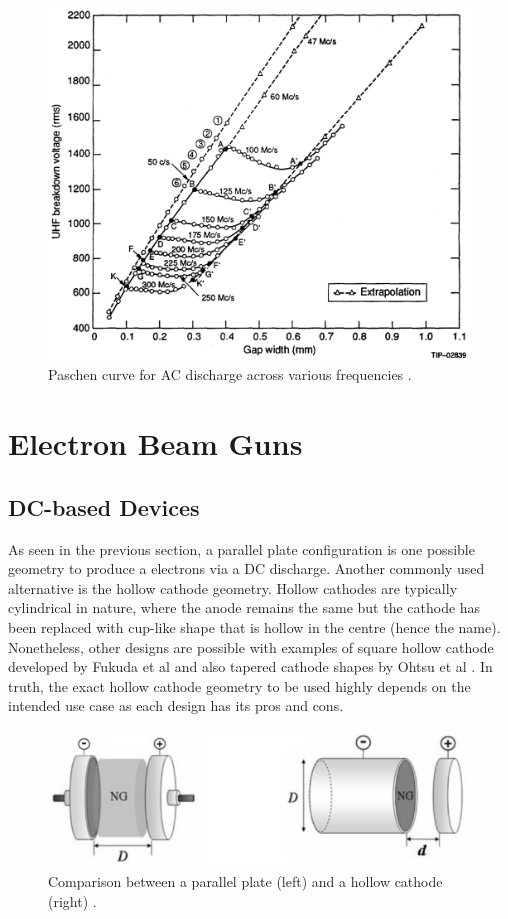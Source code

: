  
\begin{figure}[h!]
	\centering
	\includegraphics[width=\linewidth]{background/figures/ac_breakdown.png}
	\caption{Paschen curve for AC discharge across various frequencies \cite{Pim1949}.}
	\label{fig:ac_breakdown}
\end{figure} 


\section{Electron Beam Guns}

\subsection{DC-based Devices}

As seen in the previous section, a parallel plate configuration is one possible geometry to produce a electrons via a DC discharge. Another commonly used alternative is the hollow cathode geometry. Hollow cathodes are typically cylindrical in nature, where the anode remains the same but the cathode has been replaced with cup-like shape that is hollow in the centre (hence the name). Nonetheless, other designs are possible with examples of square hollow cathode developed by Fukuda et al \cite{Fukuda1998} and also tapered cathode shapes by Ohtsu et al \cite{Ohtsu2013}. In truth, the exact hollow cathode geometry to be used highly depends on the intended use case as each design has its pros and cons.

\begin{figure}[h!]
	\centering
	\includegraphics[width=0.8\linewidth]{background/figures/hollow_cathode.png}
	\caption{Comparison between a parallel plate (left) and a hollow cathode (right) \cite{Pessoa2007}.}
	\label{fig:hollow_cathode}
\end{figure} 

